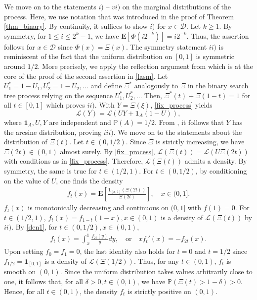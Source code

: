 \documentclass{amsart}       %
\newcommand{\E}[1]{\ensuremath{\mathbf{E} \left[#1 \right]}}
\newcommand{\Prob}[1]{\ensuremath{\mathbb{P} \left(#1 \right)}}
\newcommand{\I}[1]{\ensuremath{\mathbf{1}_{  #1  }}}
\newcommand{\Law}{\mathcal{L}}
\begin{document}
We move on to the statements $i)$ -- $vi)$ on the marginal distributions of the process. Here, we use notation that was introduced in the proof of Theorem \ref{thm_binary}. By continuity, it suffices to show $i)$ 
for $x \in \mathcal{D}$. 
Let $k \geq 1$. By symmetry, for $1 \leq i \leq 2^k-1$, we have $\E{\Phi(i 2^{-k})} = i 2^{-k}$. Thus, the assertion follows for $x \in \mathcal{D}$ since $\Phi(x) = \Xi(x)$. The symmetry statement $ii)$ is reminiscent of the fact that the uniform distribution on $[0,1]$ is symmetric around $1/2$. More precisely, we apply the reflection argument from \cite{aglama07} which is at the core of the proof of the second assertion in \eqref{lasm}. Let $U_1^* = 1 - U_1, U_2^* = 1 - U_2, \ldots$  and define $\Xi^*$ analogously to $\Xi$ in the binary search tree process relying on the sequence $U_1^*, U_2^*, \ldots$ Then, $\Xi^*(t) +\Xi(1-t) = 1$ for all $t \in [0,1]$ which proves $ii)$.
With $Y = \Xi(\xi)$, \eqref{fix_process} yields
$$\Law(Y) = \Law(U Y + \I{A} (1-U)),$$ where $\I{A}, U, Y$ are independent and $\Prob{A} = 1/2$. From \cite{anotherarcsine}, it follows that $Y$ has the arcsine distribution, proving $iii)$.
We move on to the statements about the distribution of $\Xi(t)$. 
Let $t \in (0,1/2)$. Since $\Xi$ is strictly increasing, we have $\Xi(2t) \in (0,1)$ almost surely.  By \eqref{fix_process}, $\Law(\Xi(t)) = \Law(U \Xi(2t))$ with conditions as in \eqref{fix_process}. Therefore, $\Law(\Xi(t))$ admits a density. By symmetry, the same is true for $t \in (1/2,1)$. For $t \in (0,1/2)$, by conditioning on the value of $U$, one finds the density
\begin{align} \label{den1} f_t(x) = \E{ \frac{\I{[x,1]}(\Xi(2t))}{\Xi(2t)}}, \quad x \in (0,1]. \end{align}
 $f_t(x)$ is monotonically decreasing and continuous on $(0,1]$ with $f(1)=0$.  For $t \in (1/2,1)$, $f_t(x) = f_{1-t}(1-x), x \in (0,1)$ is a density of $\Law(\Xi(t))$ by $ii)$. By \eqref{den1}, for $t \in (0,1/2), x \in (0,1)$, 
\begin{align} \label{den2} f_t(x) = \int_x^1 \frac{f_{2t}(y)}{y} dy, \quad \text{or} \quad x f_t'(x) = -f_{2t}(x). \end{align}
Upon setting $f_0 = f_1 = 0$, the last identity also holds for $t =0$ and $t = 1/2$ since $f_{1/2} = \I{[0,1]}$ is a density of $\Law(\Xi(1/2))$. Thus,  for any $t \in (0,1)$, $f_t$ is smooth on $(0,1)$. 
Since the uniform distribution takes values arbitrarily close to one, it follows that, for all $\delta > 0, t \in (0,1)$, we have $\Prob{\Xi(t) > 1 - \delta} > 0$. Hence, for all $t \in (0,1)$, the density $f_t$ is strictly positive on $(0,1)$. 
\end{document}
